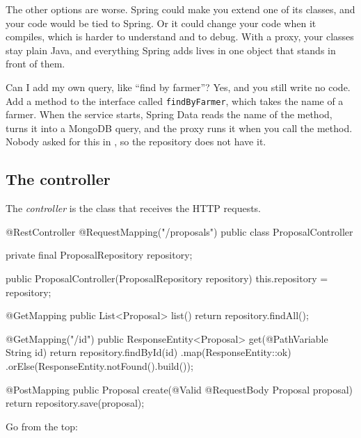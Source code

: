 The other options are worse. Spring could make you extend one of its classes,
and your code would be tied to Spring. Or it could change your code when it
compiles, which is harder to understand and to debug. With a proxy, your
classes stay plain Java, and everything Spring adds lives in one object that
stands in front of them.

\begin{question}{Can I add my own query, like ``find by farmer''?}
Yes, and you still write no code. Add a method to the interface called
\texttt{findByFarmer}, which takes the name of a farmer. When the service
starts, Spring Data
reads the name of the method, turns it into a MongoDB query, and the proxy
runs it when you call the method. Nobody asked for this in , so the
repository does not have it.
\end{question}

\subsection*{The controller}

The \emph{controller} is the class that receives the HTTP requests.

\begin{code}
@RestController
@RequestMapping("/proposals")
public class ProposalController {

    private final ProposalRepository repository;

    public ProposalController(ProposalRepository repository) {
        this.repository = repository;
    }

    @GetMapping
    public List<Proposal> list() {
        return repository.findAll();
    }

    @GetMapping("/{id}")
    public ResponseEntity<Proposal> get(@PathVariable String id) {
        return repository.findById(id)
                .map(ResponseEntity::ok)
                .orElse(ResponseEntity.notFound().build());
    }

    @PostMapping
    public Proposal create(@Valid @RequestBody Proposal proposal) {
        return repository.save(proposal);
    }
}
\end{code}

Go from the top:

